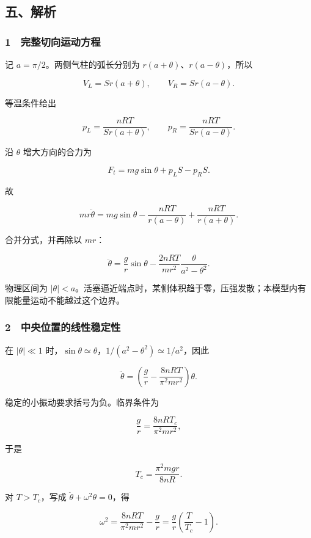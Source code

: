 \documentclass[12pt,a4paper,fontset=fandol]{ctexart}
\begin{document}
\subsection{五、解析}\label{ux4e94ux89e3ux6790-1}

\subsubsection{1　完整切向运动方程}\label{ux5b8cux6574ux5207ux5411ux8fd0ux52a8ux65b9ux7a0b}

记 \(a=\pi/2\)。两侧气柱的弧长分别为
\(r(a+\theta)\)、\(r(a-\theta)\)，所以

\[V_L=Sr(a+\theta),\qquad V_R=Sr(a-\theta).\]

等温条件给出

\[p_L=\frac{nRT}{Sr(a+\theta)},\qquad
p_R=\frac{nRT}{Sr(a-\theta)}.\]

沿 \(\theta\) 增大方向的合力为

\[F_t=mg\sin\theta+p_LS-p_RS.\]

故

\[mr\ddot\theta=mg\sin\theta
-\frac{nRT}{r(a-\theta)}+\frac{nRT}{r(a+\theta)}.\]

合并分式，并再除以 \(mr\)：

\[\boxed{\ddot\theta=\frac gr\sin\theta
-\frac{2nRT}{mr^2}\frac\theta{a^2-\theta^2}.}\]

物理区间为
\(|\theta|<a\)。活塞逼近端点时，某侧体积趋于零，压强发散；本模型内有限能量运动不能越过这个边界。

\subsubsection{2　中央位置的线性稳定性}\label{ux4e2dux592eux4f4dux7f6eux7684ux7ebfux6027ux7a33ux5b9aux6027}

在 \(|\theta|\ll1\)
时，\(\sin\theta\simeq\theta\)，\(1/(a^2-\theta^2)\simeq1/a^2\)，因此

\[\ddot\theta=\left(\frac gr-\frac{8nRT}{\pi^2mr^2}\right)\theta.\]

稳定的小振动要求括号为负。临界条件为

\[\frac gr=\frac{8nRT_c}{\pi^2mr^2},\]

于是

\[\boxed{T_c=\frac{\pi^2mgr}{8nR}.}\]

对 \(T>T_c\)，写成 \(\ddot\theta+\omega^2\theta=0\)，得

\[\boxed{\omega^2=\frac{8nRT}{\pi^2mr^2}-\frac gr
=\frac gr\left(\frac T{T_c}-1\right).}\]
\end{document}
